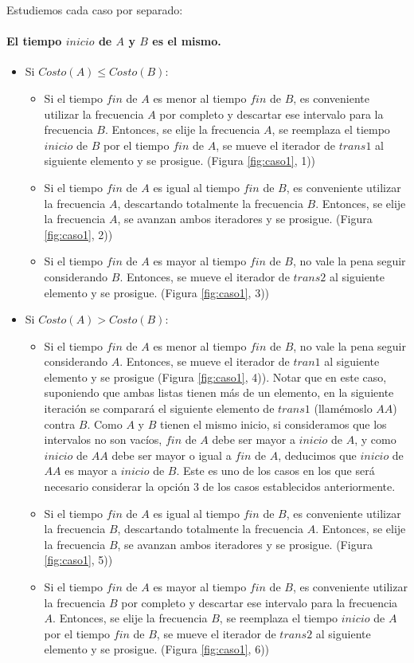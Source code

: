 Estudiemos cada caso por separado:

\paragraph{El tiempo $inicio$ de $A$ y $B$ es el mismo.}

\begin{itemize}
\item Si $Costo(A) \leq Costo(B)$:
	\begin{itemize}
	\item Si el tiempo $fin$ de $A$ es menor al tiempo $fin$ de $B$, es conveniente utilizar la frecuencia $A$ por completo y descartar ese intervalo para la frecuencia $B$. Entonces, se elije la frecuencia $A$, se reemplaza el tiempo $inicio$ de $B$ por el tiempo $fin$ de $A$, se mueve el iterador de $trans1$ al siguiente elemento y se prosigue. (Figura \ref{fig:caso1}, 1))
	\item Si el tiempo $fin$ de $A$ es igual al tiempo $fin$ de $B$, es conveniente utilizar la frecuencia $A$, descartando totalmente la frecuencia $B$.  Entonces, se elije la frecuencia $A$, se avanzan ambos iteradores y se prosigue. (Figura \ref{fig:caso1}, 2))
	\item Si el tiempo $fin$ de $A$ es mayor al tiempo $fin$ de $B$, no vale la pena seguir considerando $B$. Entonces, se mueve el iterador de $trans2$ al siguiente elemento y se prosigue. (Figura \ref{fig:caso1}, 3))
	\end{itemize}
\item Si $Costo(A) > Costo(B)$:
	\begin{itemize}
	\item Si el tiempo $fin$ de $A$ es menor al tiempo $fin$ de $B$, no vale la pena seguir considerando $A$. Entonces, se mueve el iterador de $tran1$ al siguiente elemento y se prosigue (Figura \ref{fig:caso1}, 4)). Notar que en este caso, suponiendo que ambas listas tienen más de un elemento, en la siguiente iteración se comparará el siguiente elemento de $trans1$ (llamémoslo $AA$) contra $B$.  Como $A$ y $B$ tienen el mismo inicio, si consideramos que los intervalos no son vacíos, $fin$ de $A$ debe ser mayor a $inicio$ de $A$, y como $inicio$ de $AA$ debe ser mayor o igual a $fin$ de $A$, deducimos que $inicio$ de $AA$ es mayor a $inicio$ de $B$.  Este es uno de los casos en los que será necesario considerar la opción 3 de los casos establecidos anteriormente.
	\item Si el tiempo $fin$ de $A$ es igual al tiempo $fin$ de $B$, es conveniente utilizar la frecuencia $B$, descartando totalmente la frecuencia $A$.  Entonces, se elije la frecuencia $B$, se avanzan ambos iteradores y se prosigue. (Figura \ref{fig:caso1}, 5))
	\item Si el tiempo $fin$ de $A$ es mayor al tiempo $fin$ de $B$, es conveniente utilizar la frecuencia $B$ por completo y descartar ese intervalo para la frecuencia $A$. Entonces, se elije la frecuencia $B$, se reemplaza el tiempo $inicio$ de $A$ por el tiempo $fin$ de $B$, se mueve el iterador de $trans2$ al siguiente elemento y se prosigue. (Figura \ref{fig:caso1}, 6))
	\end{itemize}
\end{itemize}

